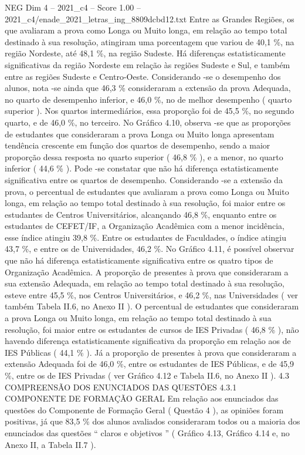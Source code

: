 \begin{textsample}{NEG Dim 4 – 2021\_c4 – Score 1.00 – 2021\_c4/enade\_2021\_letras\_ing\_8809dcbd12.txt}
Entre as Grandes Regiões, os que avaliaram a prova como Longa ou Muito longa, em relação ao tempo total destinado à sua resolução, atingiram uma porcentagem que variou de 40,1 \%, na região Nordeste, até 48,1 \%, na região Sudeste.
Há diferenças estatisticamente significativas da região Nordeste em relação às regiões Sudeste e Sul, e também entre as regiões Sudeste e Centro-Oeste.
Considerando -se o desempenho dos alunos, nota -se ainda que 46,3 \% consideraram a extensão da prova Adequada, no quarto de desempenho inferior, e 46,0 \%, no de melhor desempenho ( quarto superior ).
Nos quartos intermediários, essa proporção foi de 45,5 \%, no segundo quarto, e de 46,0 \%, no terceiro.
No Gráfico 4.10, observa -se que as proporções de estudantes que consideraram a prova Longa ou Muito longa apresentam tendência crescente em função dos quartos de desempenho, sendo a maior proporção dessa resposta no quarto superior ( 46,8 \% ), e a menor, no quarto inferior ( 44,6 \% ).
Pode -se constatar que não há diferença estatisticamente significativa entre os quartos de desempenho.
Considerando -se a extensão da prova, o percentual de estudantes que avaliaram a prova como Longa ou Muito longa, em relação ao tempo total destinado à sua resolução, foi maior entre os estudantes de Centros Universitários, alcançando 46,8 \%, enquanto entre os estudantes de CEFET/IF, a Organização Acadêmica com a menor incidência, esse índice atingiu 39,8 \%.
Entre os estudantes de Faculdades, o índice atingiu 43,7 \%, e entre os de Universidades, 46,2 \%.
No Gráfico 4.11, é possível observar que não há diferença estatisticamente significativa entre os quatro tipos de Organização Acadêmica.
A proporção de presentes à prova que consideraram a sua extensão Adequada, em relação ao tempo total destinado à sua resolução, esteve entre 45,5 \%, nos Centros Universitários, e 46,2 \%, nas Universidades ( ver também Tabela II.6, no Anexo II ).
O percentual de estudantes que consideraram a prova Longa ou Muito longa, em relação ao tempo total destinado à sua resolução, foi maior entre os estudantes de cursos de IES Privadas ( 46,8 \% ), não havendo diferença estatisticamente significativa da proporção em relação aos de IES Públicas ( 44,1 \% ).
Já a proporção de presentes à prova que consideraram a extensão Adequada foi de 46,0 \%, entre os estudantes de IES Públicas, e de 45,9 \%, entre os de IES Privadas ( ver Gráfico 4.12 e Tabela II.6, no Anexo II ). 4.3 COMPREENSÃO DOS ENUNCIADOS DAS QUESTÕES 4.3.1 COMPONENTE DE FORMAÇÃO GERAL Em relação aos enunciados das questões do Componente de Formação Geral ( Questão 4 ), as opiniões foram positivas, já que 83,5 \% dos alunos avaliados consideraram todos ou a maioria dos enunciados das questões “ claros e objetivos ” ( Gráfico 4.13, Gráfico 4.14 e, no Anexo II, a Tabela II.7 ).

\end{textsample}
